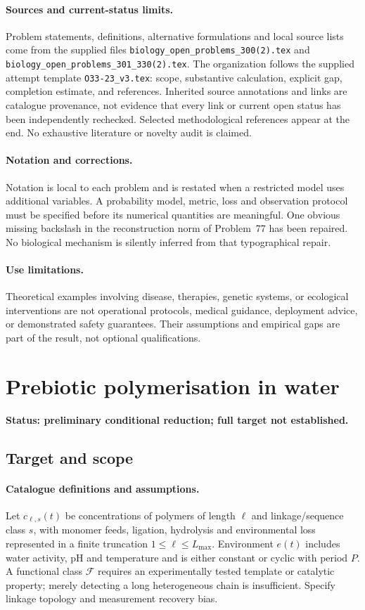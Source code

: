 \documentclass[11pt]{article}
\begin{document}
\paragraph{Sources and current-status limits.}
Problem statements, definitions, alternative formulations and local source lists
come from the supplied files
\texttt{biology\_open\_problems\_300(2).tex} and
\texttt{biology\_open\_problems\_301\_330(2).tex}.
The organization follows the supplied attempt template
\texttt{O33-23\_v3.tex}: scope, substantive calculation, explicit gap,
completion estimate, and references. Inherited source annotations and links are
catalogue provenance, not evidence that every link or current open status has
been independently rechecked. Selected methodological references appear at the
end. No exhaustive literature or novelty audit is claimed.

\paragraph{Notation and corrections.}
Notation is local to each problem and is restated when a restricted model uses
additional variables. A probability model, metric, loss and observation protocol
must be specified before its numerical quantities are meaningful. One obvious
missing backslash in the reconstruction norm of Problem~77 has been repaired.
No biological mechanism is silently inferred from that typographical repair.

\paragraph{Use limitations.}
Theoretical examples involving disease, therapies, genetic systems, or ecological
interventions are not operational protocols, medical guidance, deployment advice,
or demonstrated safety guarantees. Their assumptions and empirical gaps are part
of the result, not optional qualifications.


\section*{Prebiotic polymerisation in water}
\label{prob:283}
\noindent\textbf{Status: preliminary conditional reduction; full target not established.}
\subsection{Target and scope}
\paragraph{Catalogue definitions and assumptions.}
Let $c_{\ell,s}(t)$ be concentrations of polymers of length $\ell$ and linkage/sequence class $s$, with monomer feeds, ligation, hydrolysis and environmental loss represented in a finite truncation $1\leq\ell\leq L_{\max}$. Environment $e(t)$ includes water activity, pH and temperature and is either constant or cyclic with period $P$. A functional class $\mathcal F$ requires an experimentally tested template or catalytic property; merely detecting a long heterogeneous chain is insufficient. Specify linkage topology and measurement recovery bias.
\end{document}
